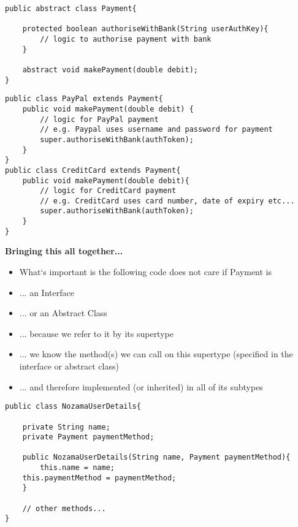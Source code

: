 \documentclass{beamer}
\begin{document}
\begin{frame}[fragile]
\begin{block}{}
\begin{lstlisting}
public abstract class Payment{

    protected boolean authoriseWithBank(String userAuthKey){
        // logic to authorise payment with bank
    }

    abstract void makePayment(double debit);
}
\end{lstlisting}
\end{block}
\end{frame}

\begin{frame}[fragile]
\begin{block}{}
\begin{lstlisting}
public class PayPal extends Payment{
    public void makePayment(double debit) {
        // logic for PayPal payment
        // e.g. Paypal uses username and password for payment
        super.authoriseWithBank(authToken);
    }
}
public class CreditCard extends Payment{
    public void makePayment(double debit){
        // logic for CreditCard payment
        // e.g. CreditCard uses card number, date of expiry etc...
        super.authoriseWithBank(authToken);
    }
}
\end{lstlisting}
\end{block}
\end{frame}

\begin{frame}
\begin{center}
\textbf{Bringing this all together...}
\end{center}
\begin{itemize}
\item What`s important is the following code does not care if Payment is
\item ... an Interface
\item ... or an Abstract Class
\bigskip
\item ... because we refer to it by its supertype 
\item ... we know the method(s) we can call on this supertype (specified in the interface or abstract class)
\item ... and therefore implemented (or inherited) in all of its subtypes
\end{itemize}
\end{frame}

\begin{frame}[fragile]
\begin{block}{}
\begin{lstlisting}
public class NozamaUserDetails{
    
    private String name;
    private Payment paymentMethod;
    
    public NozamaUserDetails(String name, Payment paymentMethod){
    	this.name = name;
	this.paymentMethod = paymentMethod;
    }
    
    // other methods...
}
\end{lstlisting}
\end{block}
\end{frame}
\end{document}
